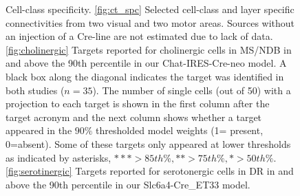 \newpage

\begin{figure}[H]
    \newline
    \caption{  Cell-class specificity. \ref{fig:ct_spc} Selected cell-class and layer specific connectivities from two visual and two motor areas.
	 Sources without an injection of a Cre-line are not estimated due to lack of data.
	 \ref{fig:cholinergic} Targets reported for cholinergic cells in MS/NDB in \citet{ Li2018-nu}  and above the 90th percentile in our Chat-IRES-Cre-neo model.
	 A black box along the diagonal indicates the target was identified in both studies ($n=35$).
	 The number of single cells (out of 50) with a projection to each target is shown in the first column after the target acronym and the next column shows whether a target appeared in the $90\%$ thresholded model weights (1= present, 0=absent).
	 Some of these targets only appeared at lower thresholds as indicated by asterisks, $*** >85th \%, ** >75th \%, * >50th \%$.
\ref{fig:serotinergic} Targets reported for serotonergic cells in DR in \citet{Ren2018-ty, Ren2019-jg} and above the 90th percentile in our Slc6a4-Cre\_ET33 model.
    		}
\label{fig:data_ct}
\end{figure}

